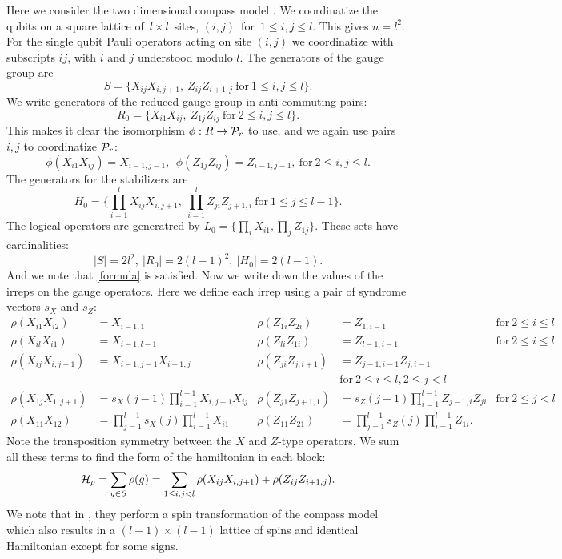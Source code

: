 \documentclass[12pt,notitlepage,longbibliography,nofootinbib,tightenlines]{revtex4}
\begin{document}
Here we consider the two dimensional compass model \cite{Bacon2006}.
We coordinatize the qubits on a square 
lattice of\ $l\times l$\ sites,
$(i, j)$\ for\ $1\le i, j\le l.$
This gives $n = l^2.$
For the single qubit Pauli operators acting on site
$(i, j)$ we coordinatize with subscripts $ij$, 
with $i$ and $j$ understood modulo $l$.
The generators of the gauge group are
$$
    S = \big\{ X_{ij}X_{i,j+1},\ Z_{ij}Z_{i+1,j}\ \mbox{for}\ 1\le i, j\le l\big\}.
$$
We write generators of the reduced
gauge group in anti-commuting pairs:
$$
    R_0 = \big\{ X_{i1}X_{ij},\ Z_{1j}Z_{ij}\ \mbox{for}\ 2\le i, j\le l\big\}.
$$
This makes it clear the isomorphism $\phi : R \to \mathcal{P}_r$ to use,
and we again use pairs $i,j$ to coordinatize $\mathcal{P}_r$:
$$
    \phi(X_{i1}X_{ij}) = X_{i-1,j-1}, \ \ \phi(Z_{1j}Z_{ij}) = Z_{i-1,j-1},\ \mbox{for}\ 2\le i, j\le l.
$$
The generators for the stabilizers are
$$
    H_0 = \big\{ \prod_{i=1}^l X_{ij}X_{i,j+1},\ \prod_{i=1}^l Z_{ji}Z_{j+1,i}\ \mbox{for}\ 1\le j\le l-1\big\}.
$$
The logical operators are generatred by $L_0 = \big\{ \prod_i X_{i1}, \prod_j Z_{1j} \}.$
These sets have cardinalities:
$$|S|=2l^2,\ |R_0| = 2(l-1)^2,\ |H_0| = 2(l-1).$$
And we note that \ref{formula} is satisfied.
Now we write down the values of the
irreps on the gauge operators.
Here we define each irrep using a pair 
of syndrome vectors $s_X$ and $s_Z:$
\begin{align*}
\rho(X_{i1} X_{i2}) &= X_{i-1,1} &
\rho(Z_{1i} Z_{2i}) &= Z_{1,i-1} &\mbox{for}\ 2\le i\le l\\
\rho(X_{il} X_{i1}) &= X_{i-1,l-1} &
\rho(Z_{li} Z_{1i}) &= Z_{l-1,i-1} &\mbox{for}\ 2\le i\le l\\
\rho(X_{ij} X_{i,j+1}) &= X_{i-1,j-1} X_{i-1,j} &
\rho(Z_{ji} Z_{j,i+1}) &= Z_{j-1,i-1}Z_{j,i-1} \\&&&\mbox{for}\ 2\le i\le l, 2\le j<l\\
\rho(X_{1j} X_{1,j+1}) &= s_X(j-1) \prod_{i=1}^{l-1} X_{i,j-1} X_{ij} &
\rho(Z_{j1} Z_{j+1,1}) &= s_Z(j-1) \prod_{i=1}^{l-1} Z_{j-1,i} Z_{ji} &\mbox{for}\ 2\le j<l\\
\rho(X_{11} X_{12}) &= \prod_{j=1}^{l-1}s_X(j) \prod_{i=1}^{l-1} X_{i1} &
\rho(Z_{11} Z_{21}) &= \prod_{j=1}^{l-1}s_Z(j) \prod_{i=1}^{l-1} Z_{1i}.
\end{align*}
Note the transposition symmetry between the $X$ and $Z$-type operators.
We sum all these terms to find 
the form of the hamiltonian in each block:
$$
\mathcal{H}_\rho = \sum_{g\in S} \rho(g) = \sum_{1\le i,j<l} \rho(X_{ij}X_{i,j+1}) + \rho(Z_{ij}Z_{i+1,j}).
$$
We note that in \cite{Brzezicki2013}, they perform a
spin transformation of the compass model
which also results in a $(l-1)\times(l-1)$ lattice
of spins and identical Hamiltonian except for some signs.
\end{document}
